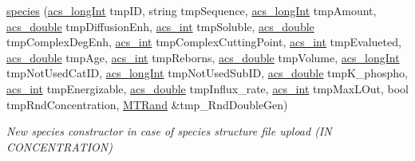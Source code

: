 \begin{DoxyCompactItemize}
\hyperlink{a00021_aee65859b467a067849cda5c12f3497c4}{species} (\hyperlink{a00050_a19319d75f02db4308bc5c0026d98cd85}{acs\+\_\+long\+Int} tmp\+I\+D, string tmp\+Sequence, \hyperlink{a00050_a19319d75f02db4308bc5c0026d98cd85}{acs\+\_\+long\+Int} tmp\+Amount, \hyperlink{a00050_ab776853a005fcbf56af0424a2a4dd607}{acs\+\_\+double} tmp\+Diffusion\+Enh, \hyperlink{a00050_a8d277355641a098190360234e2ebde35}{acs\+\_\+int} tmp\+Soluble, \hyperlink{a00050_ab776853a005fcbf56af0424a2a4dd607}{acs\+\_\+double} tmp\+Complex\+Deg\+Enh, \hyperlink{a00050_a8d277355641a098190360234e2ebde35}{acs\+\_\+int} tmp\+Complex\+Cutting\+Point, \hyperlink{a00050_a8d277355641a098190360234e2ebde35}{acs\+\_\+int} tmp\+Evalueted, \hyperlink{a00050_ab776853a005fcbf56af0424a2a4dd607}{acs\+\_\+double} tmp\+Age, \hyperlink{a00050_a8d277355641a098190360234e2ebde35}{acs\+\_\+int} tmp\+Reborns, \hyperlink{a00050_ab776853a005fcbf56af0424a2a4dd607}{acs\+\_\+double} tmp\+Volume, \hyperlink{a00050_a19319d75f02db4308bc5c0026d98cd85}{acs\+\_\+long\+Int} tmp\+Not\+Used\+Cat\+I\+D, \hyperlink{a00050_a19319d75f02db4308bc5c0026d98cd85}{acs\+\_\+long\+Int} tmp\+Not\+Used\+Sub\+I\+D, \hyperlink{a00050_ab776853a005fcbf56af0424a2a4dd607}{acs\+\_\+double} tmp\+K\+\_\+phospho, \hyperlink{a00050_a8d277355641a098190360234e2ebde35}{acs\+\_\+int} tmp\+Energizable, \hyperlink{a00050_ab776853a005fcbf56af0424a2a4dd607}{acs\+\_\+double} tmp\+Influx\+\_\+rate, \hyperlink{a00050_a8d277355641a098190360234e2ebde35}{acs\+\_\+int} tmp\+Max\+L\+Out, bool tmp\+Rnd\+Concentration, \hyperlink{a00015}{M\+T\+Rand} \&tmp\+\_\+\+Rnd\+Double\+Gen)
\begin{DoxyCompactList}\small\item\em New species constructor in case of species structure file upload (I\+N C\+O\+N\+C\+E\+N\+T\+R\+A\+T\+I\+O\+N) \end{DoxyCompactList}\item 

\end{DoxyCompactItemize}
